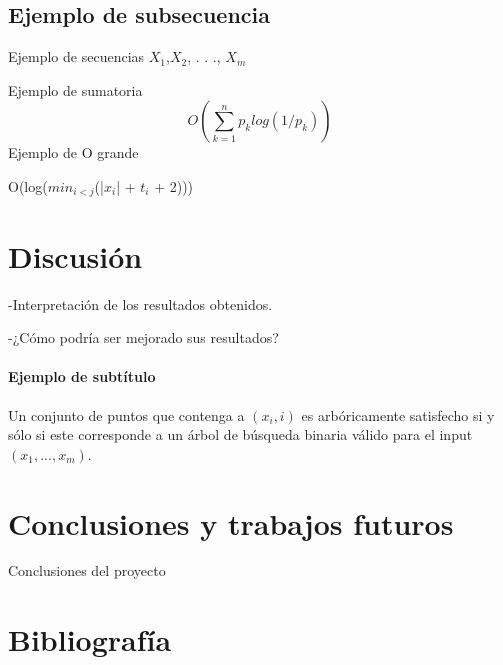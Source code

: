 \documentclass[twocolumn]{article}
\begin{document}
\subsection{Ejemplo de subsecuencia}

Ejemplo de secuencias $X_{1}$,$X_{2}$, . . ., $X_{m}$

Ejemplo de sumatoria
\[O(
\sum_{k=1}^{n}p_{k}log(1/p_{k}))
\]
 Ejemplo de O grande
\begin{center}
 O(log($min_{i<j}$(|$x_{i}$| + $t_{i}$ + 2)))    
\end{center}

\section{Discusión}

-Interpretación de los resultados obtenidos.

-¿Cómo podría ser mejorado sus resultados?






\paragraph{Ejemplo de subtítulo}
Un conjunto de puntos que contenga a $ (x_i,i) $ es arb\'oricamente
satisfecho si y s\'olo si este corresponde a un \'arbol de b\'usqueda
binaria v\'alido para el input $ (x_1,...,x_m) $.

\section{Conclusiones y trabajos futuros}
Conclusiones del proyecto
\section{Bibliografía}

%
\nocite{*}



\end{document}
